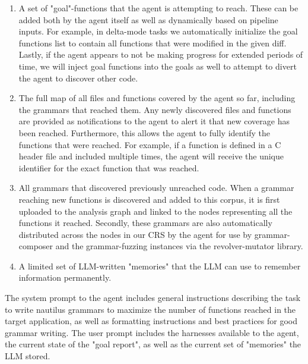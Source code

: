         \begin{enumerate}
        \item A set of "goal"-functions that the agent is attempting to reach. These can be added both by the agent itself as well as dynamically based on pipeline inputs.
        For example, in delta-mode tasks we automatically initialize the goal functions list to contain all functions that were modified in the given diff.
        Lastly, if the agent appears to not be making progress for extended periods of time, we will inject goal functions into the goals as well to attempt to divert the agent to discover other code.
        
        \item The full map of all files and functions covered by the agent so far, including the grammars that reached them.
        Any newly discovered files and functions are provided as notifications to the agent to alert it that new coverage has been reached.
        Furthermore, this allows the agent to fully identify the functions that were reached.
        For example, if a function is defined in a C header file and included multiple times, the agent will receive the unique identifier for the exact function that was reached.
        
        \item All grammars that discovered previously unreached code.
        When a grammar reaching new functions is discovered and added to this corpus, it is first uploaded to the analysis graph and linked to the nodes representing all the functions it reached.
        Secondly, these grammars are also automatically distributed across the nodes in our CRS by the \seedsync agent for use by grammar-composer and the grammar-fuzzing instances via the revolver-mutator library.
        
        \item A limited set of LLM-written "memories" that the LLM can use to remember information permanently.
        
        \end{enumerate}
        
        The system prompt to the agent includes general instructions describing the task to write nautilus grammars to maximize the number of functions reached in the target application, as well as formatting instructions and best practices for good grammar writing.
        The user prompt includes the harnesses available to the agent, the current state of the "goal report", as well as the current set of "memories" the LLM stored.
        
